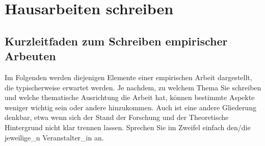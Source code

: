 \documentclass[ngerman,bibliography=totoc,oneside,12pt,a4paper]{scrbook}
\begin{document}
\chapter{Hausarbeiten schreiben}\label{hausarbeiten-schreiben}

\section{Kurzleitfaden zum Schreiben empirischer
Arbeuten}\label{kurzleitfaden-zum-schreiben-empirischer-arbeuten}

Im Folgenden werden diejenigen Elemente einer empirischen Arbeit
dargestellt, die typischerweise erwartet werden. Je nachdem, zu welchem
Thema Sie schreiben und welche thematische Ausrichtung die Arbeit hat,
können bestimmte Aspekte weniger wichtig sein oder andere hinzukommen.
Auch ist eine andere Gliederung denkbar, etwa wenn sich der Stand der
Forschung und der Theoretische Hintergrund nicht klar trennen lassen.
Sprechen Sie im Zweifel einfach den/die jeweilige\_n Veranstalter\_in
an.
\end{document}
